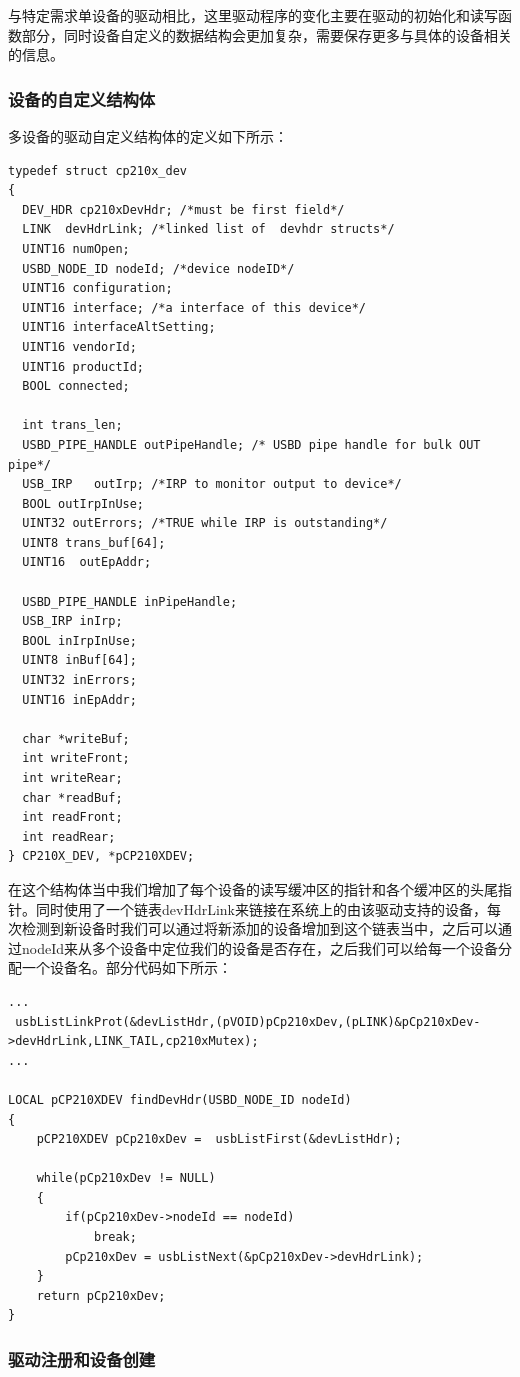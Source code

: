 与特定需求单设备的驱动相比，这里驱动程序的变化主要在驱动的初始化和读写函数部分，同时设备自定义的数据结构会更加复杂，需要保存更多与具体的设备相关的信息。

\subsubsection{设备的自定义结构体}
多设备的驱动自定义结构体的定义如下所示：
\lstset{language=C}
\begin{lstlisting}
typedef struct cp210x_dev
{
  DEV_HDR cp210xDevHdr; /*must be first field*/
  LINK 	devHdrLink; /*linked list of  devhdr structs*/
  UINT16 numOpen;
  USBD_NODE_ID nodeId; /*device nodeID*/
  UINT16 configuration; 
  UINT16 interface; /*a interface of this device*/
  UINT16 interfaceAltSetting;
  UINT16 vendorId;
  UINT16 productId;
  BOOL connected;
  
  int trans_len;
  USBD_PIPE_HANDLE outPipeHandle; /* USBD pipe handle for bulk OUT pipe*/
  USB_IRP	outIrp; /*IRP to monitor output to device*/
  BOOL outIrpInUse;
  UINT32 outErrors; /*TRUE while IRP is outstanding*/
  UINT8 trans_buf[64];
  UINT16  outEpAddr;  
  
  USBD_PIPE_HANDLE inPipeHandle;
  USB_IRP inIrp;
  BOOL inIrpInUse;
  UINT8 inBuf[64];
  UINT32 inErrors;
  UINT16 inEpAddr;
  
  char *writeBuf;
  int writeFront;
  int writeRear;
  char *readBuf;
  int readFront;
  int readRear;
} CP210X_DEV, *pCP210XDEV;
\end{lstlisting}
	在这个结构体当中我们增加了每个设备的读写缓冲区的指针和各个缓冲区的头尾指针。同时使用了一个链表devHdrLink来链接在系统上的由该驱动支持的设备，每次检测到新设备时我们可以通过将新添加的设备增加到这个链表当中，之后可以通过nodeId来从多个设备中定位我们的设备是否存在，之后我们可以给每一个设备分配一个设备名。部分代码如下所示：
\lstset{language=C}
\begin{lstlisting}
...
 usbListLinkProt(&devListHdr,(pVOID)pCp210xDev,(pLINK)&pCp210xDev->devHdrLink,LINK_TAIL,cp210xMutex);
...

LOCAL pCP210XDEV findDevHdr(USBD_NODE_ID nodeId)
{
	pCP210XDEV pCp210xDev =  usbListFirst(&devListHdr);

	while(pCp210xDev != NULL)
	{
		if(pCp210xDev->nodeId == nodeId)
			break;
		pCp210xDev = usbListNext(&pCp210xDev->devHdrLink);
	}
	return pCp210xDev;
}
\end{lstlisting}

\subsubsection{驱动注册和设备创建}

